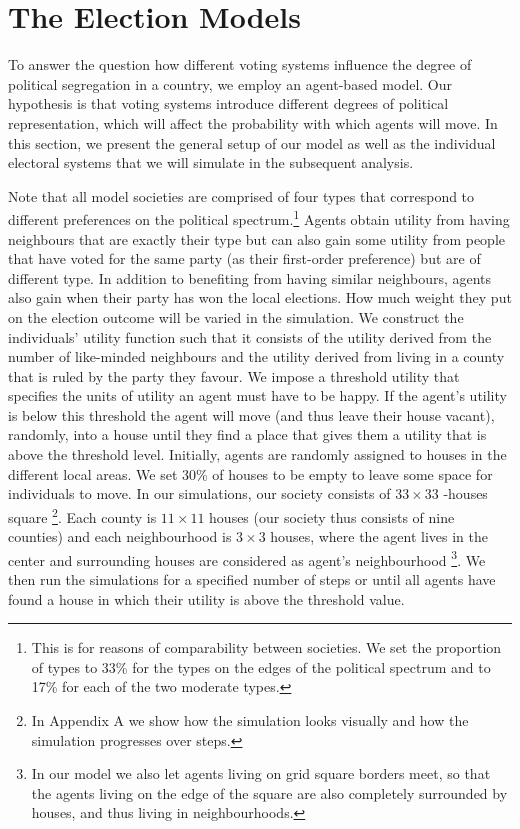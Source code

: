 \documentclass[12pt, a4paper]{article}
\begin{document}
	\section{\label{model}The Election Models}
	To answer the question how different voting systems influence the degree of political segregation in a country, we employ an agent-based model. Our hypothesis is that voting systems introduce different degrees of political representation, which will affect the probability with which agents will move. In this section, we present the general setup of our model as well as the individual electoral systems that we will simulate in the subsequent analysis.
	
	Note that all model societies are comprised of four types that correspond to different preferences on the political spectrum.\footnote{This is for reasons of comparability between societies. We set the proportion of types to 33\% for the types on the edges of the political spectrum and to 17\% for each of the two moderate types.} Agents obtain utility from having neighbours that are exactly their type but can also gain some utility from people that have voted for the same party (as their first-order preference) but are of different type. In addition to benefiting from having similar neighbours, agents also gain when their party has won the local elections. How much weight they put on the election outcome will be varied in the simulation.	We construct the individuals' utility function such that it consists of the utility derived from the number of like-minded neighbours and the utility derived from living in a county that is ruled by the party they favour. We impose a threshold utility that specifies the units of utility an agent must have to be happy. If the agent's utility is below this threshold the agent will move (and thus leave their house vacant), randomly, into a house until they find a place that gives them a utility that is above the threshold level. Initially, agents are randomly assigned to houses in the different local areas. We set 30\% of houses to be empty to leave some space for individuals to move. In our simulations, our society consists of $33\times33$ -houses square \footnote{In Appendix A we show how the simulation looks visually and how the simulation progresses over steps.}. Each county is $11\times11$ houses (our society thus consists of nine counties) and each neighbourhood is $3\times3$ houses, where the agent lives in the center and surrounding houses are considered as agent's neighbourhood \footnote{In our model we also let agents living on grid square borders meet, so that the agents living on the edge of the square are also completely surrounded by houses, and thus living in neighbourhoods.}. We then run the simulations for a specified number of steps or until all agents have found a house in which their utility is above the threshold value.
	
\end{document}
